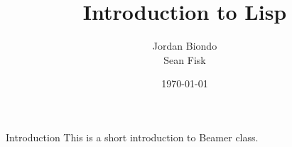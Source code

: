 \documentclass{beamer}
\title[Lisp Introduction]{Introduction to Lisp}
\author{Jordan Biondo \\ Sean Fisk}
\institute{Grand Valley State University}
\date{\today}
\begin{document}
\begin{frame}
\titlepage
\end{frame}


\begin{frame}{Introduction}
This is a short introduction to Beamer class.
\end{frame}
\end{document}
